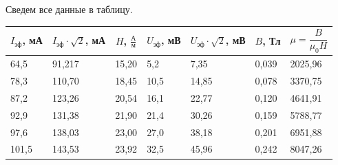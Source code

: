 \documentclass[a4paper,12pt]{article} %
\begin{document}
\newpage
Сведем все данные в таблицу.
\begin{table}[h!]
	\centering
	\begin{tabular}{|l|l|l|l|l|l|l|}
		\hline
		\multicolumn{1}{|c|}{$I_{\text{эф}}$, мА} & \multicolumn{1}{c|}{$I_{\text{эф}} \cdot \sqrt{2}$, мА} & \multicolumn{1}{c|}{$H$, $\frac{\text{А}}{\text{м}}$} & \multicolumn{1}{c|}{$U_{\text{эф}}$, мВ} & \multicolumn{1}{c|}{$U_{\text{эф}} \cdot \sqrt{2}$, мВ} & \multicolumn{1}{c|}{$B$, Тл} & \multicolumn{1}{c|}{$\mu = \dfrac{B}{\mu_0 H}$} \\ \hline
		64,5                                      & 91,217                                                  & 15,20                                                 & 5,2                                      & 7,35                                                    & 0,039                        & 2025,96                                         \\ \hline
		78,3                                      & 110,70                                                  & 18,45                                                 & 10,5                                     & 14,85                                                   & 0,078                        & 3370,75                                         \\ \hline
		87,2                                      & 123,26                                                  & 20,54                                                 & 16,1                                     & 22,77                                                   & 0,120                        & 4641,91                                         \\ \hline
		92,9                                      & 131,38                                                  & 21,90                                                 & 21,4                                     & 30,26                                                   & 0,159                        & 5788,77                                         \\ \hline
		97,6                                      & 138,03                                                  & 23,00                                                 & 27,0                                     & 38,18                                                   & 0,201                        & 6951,88                                         \\ \hline
		101,5                                     & 143,53                                                  & 23,92                                                 & 32,5                                     & 45,96                                                   & 0,242                        & 8047,26                                         \\ \hline

\end{tabular}
\end{table}
\end{document}
